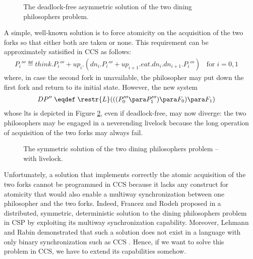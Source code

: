   \begin{figure}[t]
    \centering
    \caption{The deadlock-free asymmetric solution of the two dining philosophers problem.}
    \label{dp-asym-lts}
  \end{figure}

  A simple, well-known solution is to force atomicity on the acquisition of the two forks so that either both are taken or none. This requirement can be approximately satisified in CCS as follows:
  \begin{eqnarray*}
    P_i''' \eqdef think.P_i''' +  up_i.(dn_i.P_i''' + up_{i+1}.eat.dn_i.dn_{i+1}.P_i''')  \; \;  \mbox{   for  }i = 0, 1 
  \end{eqnarray*}
  where, in case the second fork in unavailable, the philosopher may put down the first fork and return to its initial state. However, the new system
  \begin{eqnarray*}
    DP'' \;  \eqdef \;  \restr{L}(((P_0'''\para P_1''') \para F_0) \para F_1) 
  \end{eqnarray*}
  whose lts is depicted in Figure \ref{dp-live-lts-tex}, even if deadlock-free, may now diverge: the two philosophers may be engaged in a neverending livelock because the long operation of acquisition of the two forks may always fail.

  \begin{figure}[t]
    \centering
    \caption{The symmetric solution of the two dining philosophers problem -- with livelock.}
    \label{dp-live-lts-tex}
  \end{figure}

Unfortunately, a solution that implements correctly the atomic acquisition of the two forks cannot be programmed in CCS because it lacks any construct for atomicity that would also enable a multiway synchronization between one philosopher and the two forks.  Indeed, Francez and Rodeh proposed in \cite{FR80} a distributed, symmetric, deterministic solution to the dining philosophers problem in  CSP \cite{Hoa85} by exploiting its  multiway synchronization capability. Moreover, Lehmann and Rabin demonstrated that such a solution  does not exist in a language with only binary synchronization such as CCS \cite{LR81}. Hence, if we want to solve this problem in CCS, we have to extend its capabilities somehow.


